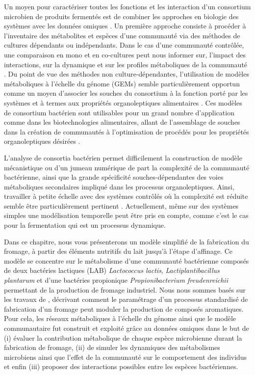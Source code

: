 \documentclass[../main.tex]{subfiles}
\begin{document}
Un moyen pour caractériser toutes les fonctions et les interaction d'un consortium microbien de produits fermentés est de combiner les approches en biologie des systèmes avec les données omiques \citep{Mannaa.2021}. Un première approche consiste à procéder à l'inventaire des métabolites et espèces d'une communauté via des méthodes de cultures dépendants ou indépendants\citep{Blasche.2021}. Dans le cas d'une communauté contrôlée, une comparaison en mono et en co-cultures peut nous informer sur, l'impact des interactions, sur la dynamique et sur les profiles métaboliques de la communauté \citep{Ozcan.2020}. Du point de vue des méthodes non culture-dépendantes, l'utilisation de modèles métaboliques à l'échelle du génome (GEMs) \citep{Fang.2020} semble particulièrement opportun comme un moyen d'associer les souches du consortium à la fonction porté par les systèmes et à termes aux propriétés organoleptiques alimentaires \citep{Ozcan.2020}. Ces modèles de consortium bactérien sont utilisables pour un grand nombre d'application comme dans les biotechnologies alimentaires, allant de l'assemblage de souches dans la création de communautés à l'optimisation de procédés pour les propriétés organoleptiques désirées \citep{Rau.2018}.

L'analyse de consortia bactérien permet difficilement la construction de modèle mécanistique ou d'un jumeau numérique de part la complexité de la communauté bactérienne, ainsi que la grande spécificité souches-dépendantes des voies métaboliques secondaires impliqué dans les processus organoleptiques. Ainsi, travailler à petite échelle avec des systèmes contrôlés où la complexité est réduite semble être particulièrement pertinent \citep{Rau.2018}. Actuellement, même sur des systèmes simples une modélisation temporelle peut être pris en compte, comme c'est le cas pour la fermentation qui est un processus dynamique. 


Dans ce chapitre, nous vous présenterons un modèle simplifié de la fabrication du fromage, à partir des éléments nutritifs du lait jusqu'à l'étape d'affinage. Ce modèle se concentre sur le métabolisme d'une communauté bactérienne composés de deux bactéries lactiques (LAB) \textit{Lactococcus lactis}, \textit{Lactiplantibacillus plantarum} et d'une bactéries propionique \textit{Propionibacterium freudenreichii} permettant de la production de fromage industriel. Nous nous sommes basés sur les travaux de \citep{Cao2021}, décrivant comment le paramétrage d'un processus standardisé de fabrication d'un fromage peut moduler la production de composés aromatiques. Pour cela, les réseaux métaboliques à l'échelle du génome ainsi que le modèle communautaire fut construit et exploité grâce au données omiques dans le but de (i) évaluer la contribution métabolique de chaque espèce microbienne durant la fabrication de fromage, (ii) de simuler les dynamiques des métabolismes microbiens ainsi que l'effet de la communauté sur le comportement des individus et enfin (iii) proposer des interactions possibles entre les espèces bactériennes.
\end{document}
